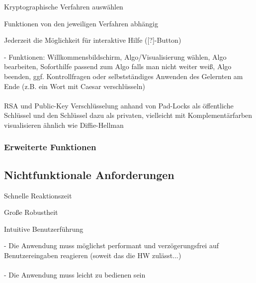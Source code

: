 \documentclass{article}
\begin{document}
\begin{FA}[start=200]
\item Kryptographische Verfahren auswählen
\end{FA}

\begin{FA}[start=300]
\item Funktionen von den jeweiligen Verfahren abhängig
\end{FA}

\begin{FA}[start=400]
\item Jederzeit die Möglichkeit für interaktive Hilfe ([?]-Button)
\end{FA}

- Funktionen: Willkommensbildschirm, Algo/Visualisierung wählen, Algo bearbeiten, 
Soforthilfe passend zum Algo falls man nicht weiter weiß, Algo beenden, 
ggf. Kontrollfragen oder selbstständiges Anwenden des Gelernten am Ende (z.B. ein Wort mit Caesar verschlüsseln)
\\
\\
RSA und Public-Key Verschlüsselung anhand von Pad-Locks als 
öffentliche Schlüssel und den Schlüssel  dazu als privaten,
vielleicht mit Komplementärfarben visualisieren ähnlich wie Diffie-Hellman

\subsubsection{Erweiterte Funktionen}

\subsection{Nichtfunktionale Anforderungen}

\begin{NA}[start=100]
\item Schnelle Reaktionszeit
\end{NA}
\begin{NA}[start=200]
\item Große Robustheit
\end{NA}
\begin{NA}[start=300]
\item Intuitive Benutzerführung
\end{NA}

- Die Anwendung muss möglichst performant und verzögerungsfrei auf Benutzereingaben reagieren (soweit das die HW zulässt...)
\\
\\
- Die Anwendung muss leicht zu bedienen sein
\end{document}
